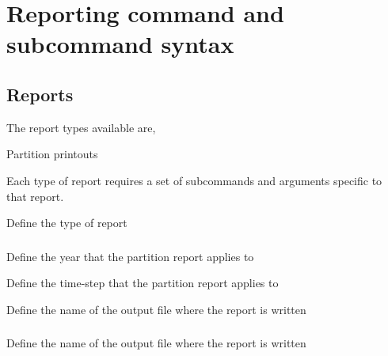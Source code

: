 \section{Reporting command and subcommand syntax\label{sec:output-syntax}}

\subsection{Reports}

The report types available are,

\begin{description}
  \item Partition printouts
\end{description}

Each type of report requires a set of subcommands and arguments specific to that report.


 {Define the type of report}

\subsubsection[Printing the partition]{}

 {Define the year that the partition report applies to}

 {Define the time-step that the partition report applies to}

 {Define the name of the output file where the report is written}

\subsubsection[Printing the free parameters]{\label{sec:InputFileFormat}}

 {Define the name of the output file where the report is written}

